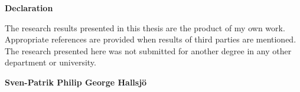\vspace*{1.75in}
\begin{center} {\bf Declaration}\end{center}

The research results presented in this thesis are the product of my own work. Appropriate references are provided when results of third parties are mentioned. The research presented here was not submitted for another degree in any other department or university.

\begin{flushright} \textbf{Sven-Patrik Philip George Hallsj{\"o}}\end{flushright}
